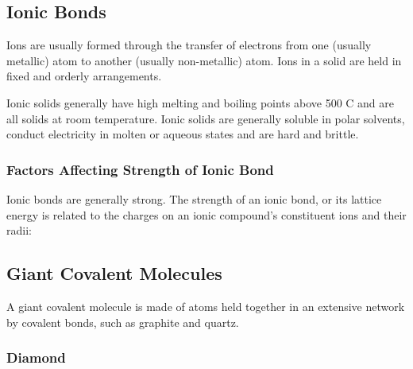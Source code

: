 \documentclass[../main]{subfiles}
\begin{document}
	\subsection{Ionic Bonds}


	Ions are usually formed through the transfer of electrons from one (usually metallic) atom to another (usually non-metallic) atom. Ions in a solid are held in fixed and orderly arrangements.


	Ionic solids generally have high melting and boiling points above 500 \degree C and are all solids at room temperature. Ionic solids are generally soluble in polar solvents, conduct electricity in molten or aqueous states and are hard and brittle.

	\subsubsection{Factors Affecting Strength of Ionic Bond}


	Ionic bonds are generally strong. The strength of an ionic bond, or its lattice energy is related to the charges on an ionic compound's constituent ions and their radii:


	\subsection{Giant Covalent Molecules}

	A giant covalent molecule is made of atoms held together in an extensive network by covalent bonds, such as graphite and quartz.

	\subsubsection{Diamond}
\end{document}
